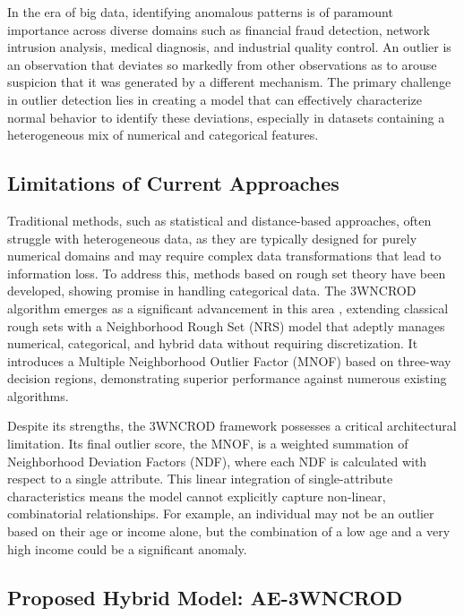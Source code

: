 \documentclass[12pt,a4paper]{article}
\begin{document}
In the era of big data, identifying anomalous patterns is of paramount importance across diverse domains such as financial fraud detection, network intrusion analysis, medical diagnosis, and industrial quality control. An outlier is an observation that deviates so markedly from other observations as to arouse suspicion that it was generated by a different mechanism. The primary challenge in outlier detection lies in creating a model that can effectively characterize normal behavior to identify these deviations, especially in datasets containing a heterogeneous mix of numerical and categorical features.

\subsection{Limitations of Current Approaches}

Traditional methods, such as statistical and distance-based approaches, often struggle with heterogeneous data, as they are typically designed for purely numerical domains and may require complex data transformations that lead to information loss. To address this, methods based on rough set theory have been developed, showing promise in handling categorical data. The 3WNCROD algorithm emerges as a significant advancement in this area \cite{zhang2024}, extending classical rough sets with a Neighborhood Rough Set (NRS) model \cite{hu2008} that adeptly manages numerical, categorical, and hybrid data without requiring discretization. It introduces a Multiple Neighborhood Outlier Factor (MNOF) based on three-way decision regions, demonstrating superior performance against numerous existing algorithms.

Despite its strengths, the 3WNCROD framework possesses a critical architectural limitation. Its final outlier score, the MNOF, is a weighted summation of Neighborhood Deviation Factors (NDF), where each NDF is calculated with respect to a single attribute. This linear integration of single-attribute characteristics means the model cannot explicitly capture non-linear, combinatorial relationships. For example, an individual may not be an outlier based on their age or income alone, but the combination of a low age and a very high income could be a significant anomaly.

\subsection{Proposed Hybrid Model: AE-3WNCROD}
\end{document}
